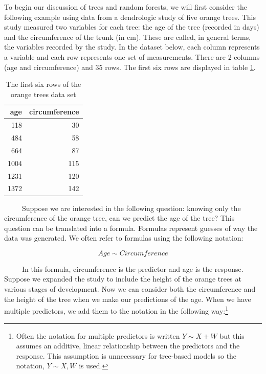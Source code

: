 \documentclass[12pt,twoside]{reedthesis}
\begin{document}
  To begin our discussion of trees and random forests, we will first
  consider the following example using data from a dendrologic study of
  five orange trees. This study measured two variables for each tree: the
  age of the tree (recorded in days) and the circumference of the trunk
  (in cm). These are called, in general terms, the variables recorded by
  the study. In the dataset below, each column represents a variable and
  each row represents one set of measurements. There are 2 columns (age
  and circumference) and 35 rows. The first six rows are displayed in
  table \ref{tab:taborange}.
  
  \begin{table}
  
  \caption{\label{tab:unnamed-chunk-2}\label{tab:taborange}The first six rows of the orange trees data set}
  \centering
  \begin{tabular}[t]{r|r}
  \hline
  age & circumference\\
  \hline
  118 & 30\\
  \hline
  484 & 58\\
  \hline
  664 & 87\\
  \hline
  1004 & 115\\
  \hline
  1231 & 120\\
  \hline
  1372 & 142\\
  \hline
  \end{tabular}
  \end{table}
  
  ~~~~~Suppose we are interested in the following question: knowing only
  the circumference of the orange tree, can we predict the age of the
  tree? This question can be translated into a formula. Formulas represent
  guesses of way the data was generated. We often refer to formulas using
  the following notation:
  
  \[Age \sim Circumference \]
  
  ~~~~~In this formula, circumference is the predictor and age is the
  response. Suppose we expanded the study to include the height of the
  orange trees at various stages of development. Now we can consider both
  the circumference and the height of the tree when we make our
  predictions of the age. When we have multiple predictors, we add them to
  the notation in the following way:\footnote{Often the notation for
    multiple predictors is written \(Y \sim X+W\) but this assumes an
    additive, linear relationship between the predictors and the response.
    This assumption is unnecessary for tree-based models so the notation,
    \(Y\sim X,W\) is used.}
  
\end{document}
